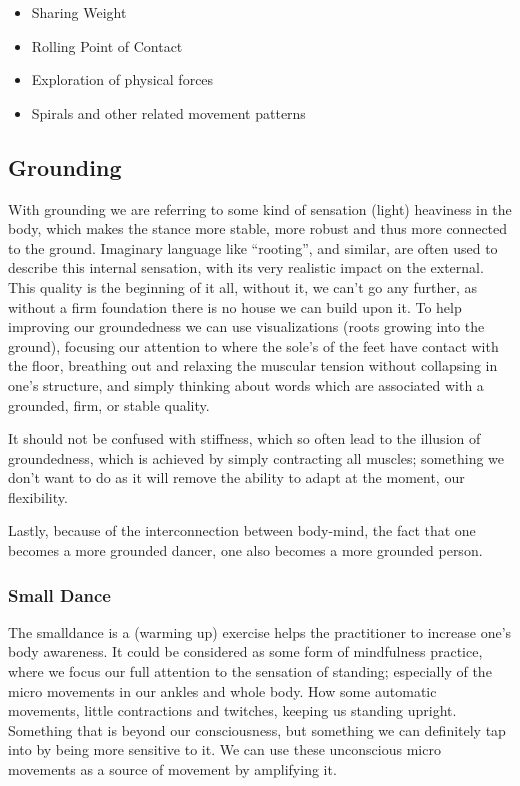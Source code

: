 \begin{itemize}
    \item Sharing Weight
    \item Rolling Point of Contact
    \item Exploration of physical forces
    \item Spirals and other related movement patterns
\end{itemize}

\subsection{Grounding}\label{subsec:grounding}

With grounding we are referring to some kind of sensation (light) heaviness in the body, which makes the stance more stable, more robust and thus more connected to the ground.
Imaginary language like ``rooting'', and similar, are often used to describe this internal sensation, with its very realistic impact on the external.
This quality is the beginning of it all, without it, we can't go any further, as without a firm foundation there is no house we can build upon it.
To help improving our groundedness we can use visualizations (roots growing into the ground), focusing our attention to where the sole's of the feet have contact with the floor, breathing out and relaxing the muscular tension without collapsing in one's structure, and simply thinking about words which are associated with a grounded, firm, or stable quality.

It should not be confused with stiffness, which so often lead to the illusion of groundedness, which is achieved by simply contracting all muscles; something we don't want to do as it will remove the ability to adapt at the moment, our flexibility.

Lastly, because of the interconnection between body-mind, the fact that one becomes a more grounded dancer, one also becomes a more grounded person.

\subsubsection{Small Dance}

The \gls{smalldance} is a (warming up) exercise helps the practitioner to increase one's body awareness.
It could be considered as some form of mindfulness practice, where we focus our full attention to the sensation of standing; especially of the micro movements in our ankles and whole body.
How some automatic movements, little contractions and twitches, keeping us standing upright.
Something that is beyond our consciousness, but something we can definitely tap into by being more sensitive to it.
We can use these unconscious micro movements as a source of movement by amplifying it.

